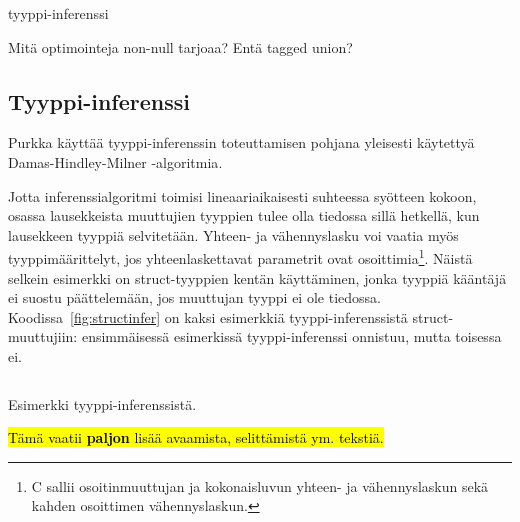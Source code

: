 tyyppi-inferenssi

Mitä optimointeja non-null tarjoaa? Entä tagged union?

\subsection{Tyyppi-inferenssi}

Purkka käyttää tyyppi-inferenssin toteuttamisen pohjana yleisesti käytettyä
Damas-Hindley-Milner -algoritmia\citep{hindley, milner, damas}.

Jotta inferenssialgoritmi toimisi lineaariaikaisesti suhteessa syötteen kokoon,
osassa lausekkeista muuttujien tyyppien tulee olla tiedossa sillä hetkellä, kun
lausekkeen tyyppiä selvitetään. Yhteen- ja vähennyslasku voi vaatia myös
tyyppimäärittelyt, jos yhteenlaskettavat parametrit ovat osoittimia\footnote{C
sallii osoitinmuuttujan ja kokonaisluvun yhteen- ja vähennyslaskun sekä kahden
osoittimen vähennyslaskun.}. Näistä selkein esimerkki on struct-tyyppien kentän
käyttäminen, jonka tyyppiä kääntäjä ei suostu päättelemään, jos muuttujan
tyyppi ei ole tiedossa. Koodissa~\ref{fig:structinfer} on kaksi esimerkkiä
tyyppi-inferenssistä struct-muuttujiin: ensimmäisessä esimerkissä
tyyppi-inferenssi onnistuu, mutta toisessa ei.

\begin{listing}[ht!]
    \inputminted{Rust}{koodi/infer.prk}
    \caption{Esimerkki tyyppi-inferenssistä.}
    \label{fig:structinfer}
\end{listing}

\FloatBarrier

\hl{Tämä vaatii \textbf{paljon} lisää avaamista, selittämistä ym. tekstiä.}

\newcommand{\hmtag}[1]{\tag*{[#1]}\hspace*{1cm}} 

